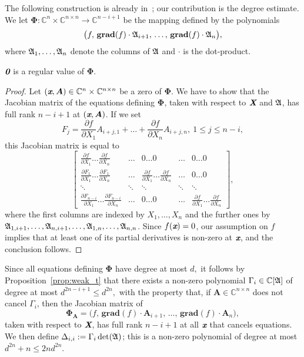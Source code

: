 \documentclass[sigconf]{acmart}
\def\bz{\textit{\textbf{0}}}
\def\Xb{\textit{\textbf{X}}}
\def\mA{{\bm A}}
\def\xb{\textit{\textbf{x}}}
\def\C{\mathbb{C}}
\def\grad{\textbf{grad}}
\def\pa{\partial}
\def\A{\frak{A}}
\begin{document}
The following construction is already in~\cite{BaGiHeMb97}; our
contribution is the degree estimate. We let $\bm\Phi: \C^n \times
\C^{n\times n} \to \C^{n-i+1}$ be the mapping defined by the
polynomials 
\[
  \big( f,\,\grad(f)\cdot \A_{i+1},\,\hdots,\, \grad(f)\cdot \A_n \big ),
\] 
where $\A_1,\hdots,\A_n$ denote the columns of $\A$ and $\cdot$ is the dot-product.
\begin{lemma} 
  $\bz$ is a regular value of $\bm\Phi$.
\end{lemma}
\begin{proof}
Let $(\xb,\mA) \in \C^n \times \C^{n\times n}$ be a zero of $\bm\Phi$.
We have to show that the Jacobian matrix of the equations defining
$\bm \Phi$, taken with respect to $\Xb$ and $\A$, has full rank
$n-i+1$ at $(\xb,\mA)$.
If we set 
\[
F_j = \frac{\pa f}{\pa X_1} A_{i+j,1} + \hdots + \frac{\pa f}{\pa X_n}A_{i+j,n}, ~1 \leq j \leq n-i,
\]
this Jacobian matrix is equal to
{\small \[
\left[ 
\begin{array}{cccccc}
\frac{\pa f}{\pa X_1} \hdots \frac{\pa f}{\pa X_n}             &\hdots& 0 \hdots 0                                         & \hdots & 0\hdots 0 \\ 
\frac{\pa F_{1}}{\pa X_1}\hdots \frac{\pa F_{1}}{\pa X_n}      &\hdots& \frac{\pa f}{\pa X_1} \hdots \frac{\pa f}{\pa X_n} & \hdots & 0\hdots 0 \\
\ddots                                                         &\ddots&\ddots                                              & \ddots & \ddots \\
\frac{\pa F_{n-i}}{\pa X_1}\hdots \frac{\pa F_{n-i}}{\pa X_n}  &\hdots&0 \hdots 0&  \hdots & \frac{\pa f}{\pa X_1} \hdots \frac{\pa f}{\pa X_n}  
\end{array}
\right],
\]}%
where the first columns are indexed by $X_1,\dots,X_n$ and the further
ones by $\A_{1,i+1},\dots,\A_{n,i+1},\dots,\A_{1,n},\dots,\A_{n,n}$.
Since $f(\xb)=0$, our assumption on $f$ implies that at least one of
its partial derivatives is non-zero at $\xb$, and the conclusion
follows.
\end{proof}
Since all equations defining $\bm \Phi$ have degree at most $d,$ it
follows by Proposition~\ref{prop:weak_t} that there exists a non-zero
polynomial $\Gamma_i \in \C[\A]$ of degree at most $d^{2n-i+1}\leq
d^{2n},$ with the property that, if $\mA \in \C^{n\times n}$ does not
cancel $\Gamma_i$, then the Jacobian matrix of $$\bm\Phi_\mA=\big(
f,\,\grad(f)\cdot \mA_{i+1},\,\hdots,\, \grad(f)\cdot \mA_n \big ),$$
taken with respect to $\Xb$, has full rank $n-i+1$ at all $\xb$ that
cancels equations. We then define $\Delta_{i,i}:=\Gamma_i
\det(\A)$; this is a non-zero polynomial of degree at most $d^{2n}+n
\le 2nd^{2n}$.
\end{document}
